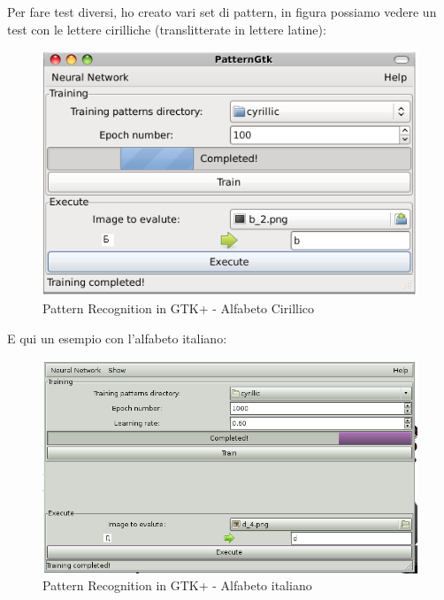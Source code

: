 \documentclass[a4paper,10pt]{report}
\begin{document}
Per fare test diversi, ho creato vari set di pattern, in figura possiamo
vedere un test con le lettere cirilliche (translitterate in lettere latine):

\begin{figure}[!ht]
	\begin{center}	
		\includegraphics[scale=0.5]{img/screen/patrec1.png}
		\caption{Pattern Recognition in GTK+ - Alfabeto Cirillico}
		\label{fig: Programma di Pattern Recognition in GTK+ - Cirillico}
	\end{center}
\end{figure}


E qui un esempio con l'alfabeto italiano:
\begin{figure}[!ht]
	\begin{center}	
		\includegraphics[scale=0.5]{img/screen/patrec2.png}
		\caption{Pattern Recognition in GTK+ - Alfabeto italiano}
		\label{fig: Programma di Pattern Recognition in GTK+ - Italiano}
	\end{center}
\end{figure}
\end{document}
